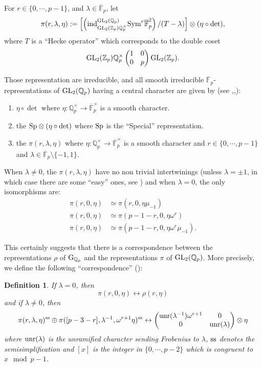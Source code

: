 \documentclass[11pt]{amsart}
\def\Z{{\mathbb Z}_p}
\def\Q{{\mathbb Q}_p}
\def\F{{\mathbb F}_p}
\def\g{{\rm G}_{\Q}}
\def\G{{\rm GL}_2(\Q)}
\def\K{{\rm GL}_2(\Z)}
\def\ra{\rightarrow}
\newtheorem{definit}{\bf{Definition}}[subsection]
\begin{document}
For $r \in \{0,\cdots,p-1\}$,   
and $\lambda \in \overline\F$, let  
\[ \pi(r,\lambda,\eta) := \left[ \left( {\rm ind}_{\K \Q^{\times}}^{\G}  
{\rm Sym}^r \overline\F^2 \right) / (T-\lambda) \right]  
\otimes (\eta \circ \det), \] 
where $T$ is a ``Hecke operator'' which corresponds to the double 
coset \[ \K\Q^{\times} \begin{pmatrix} 1 & 0 \\ 0 & p \end{pmatrix} \K. \] 
 
Those representation are irreducible, 
and all smooth irreducible $\overline\F$-representations of $\G$  having 
a central character are given by (see \cite{BL1},\cite{BL},\cite{Br1}): 
\begin{enumerate} 
\item $\eta \circ \det$ where $\eta:\Q^{\times} 
\ra \overline\F^{\times}$ is a smooth character. 
\item the ${\rm Sp} \otimes (\eta \circ \det)$ where ${\rm Sp}$ is  
the ``Special'' representation. 
\item the $\pi(r,\lambda,\eta)$  
where $\eta:\Q^{\times} \ra \overline\F^{\times}$ is a smooth character 
and $r \in \{0,\cdots,p-1\}$ and  
$\lambda \in \overline\F \setminus \{-1,1\}$. 
\end{enumerate} 
 
When $\lambda \neq 0$, the $\pi(r,\lambda,\eta)$ have no non  
trivial intertwinings (unless $\lambda = \pm 1$, in which case 
there are some ``easy'' ones, see \cite{BL}) and when $\lambda=0$, 
the only isomorphisms are: 
\begin{align*} 
\pi(r,0,\eta) & \simeq \pi(r,0,\eta \mu_{-1}) \\ 
\pi(r,0,\eta) & \simeq \pi(p-1-r,0,\eta \omega^r) \\ 
\pi(r,0,\eta) & \simeq \pi(p-1-r,0,\eta \omega^r \mu_{-1}). 
\end{align*} 
 
This certainly suggests that there is a correspondence between the  
representations $\rho$ of $\g$ and the representations $\pi$ of $\G$. 
More precisely, we define the following ``correspondence'' (\cite{Br1}): 
\begin{definit}\label{corrmodp} 
If $\lambda=0$, then  
\[ \pi(r,0,\eta) \leftrightarrow \rho(r,\eta) \]  
and if $\lambda \neq 0$, then 
\[ \pi(r,\lambda,\eta)^{\rm ss} \oplus  
\pi([p-3-r],\lambda^{-1},\omega^{r+1} \eta)^{\rm ss}  
\leftrightarrow 
\begin{pmatrix} 
{\rm unr}(\lambda^{-1}) \omega^{r+1} & 0 \\ 0 & {\rm unr}(\lambda)
\end{pmatrix} \otimes \eta \] 
where ${\rm unr}(\lambda)$ is the unramified character sending Frobenius  
to $\lambda$, ${\rm ss}$ denotes the semisimplification and $[x]$ is  
the integer  in $\{0,\cdots,p-2\}$ which is congruent to $x \mod{p-1}$. 
\end{definit} 
 
\end{document}
